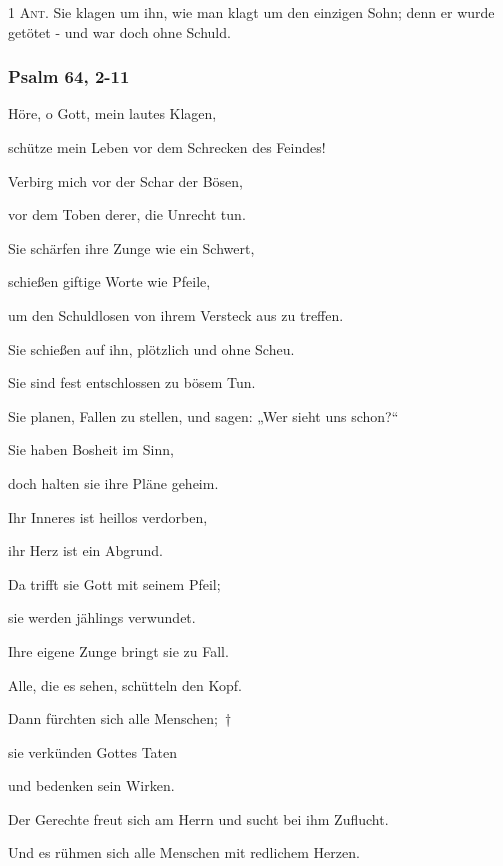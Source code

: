 \noindent \textsc{1 Ant.} Sie klagen um ihn, wie man klagt um den einzigen Sohn; denn er wurde getötet - und war doch ohne Schuld.

\subsubsection{Psalm 64, 2-11}

\noindent Höre, o Gott, mein lautes Klagen,~\GreStar{}~\nopagebreak

schütze mein Leben vor dem Schrecken des Feindes!

\noindent Verbirg mich vor der Schar der Bösen,~\GreStar{}~\nopagebreak

vor dem Toben derer, die Unrecht tun.

\noindent Sie schärfen ihre Zunge wie ein Schwert,~\GreStar{}~\nopagebreak

schießen giftige Worte wie Pfeile,

\noindent um den Schuldlosen von ihrem Versteck aus zu treffen.~\GreStar{}~\nopagebreak

Sie schießen auf ihn, plötzlich und ohne Scheu.

\noindent Sie sind fest entschlossen zu bösem Tun.~\GreStar{}~\nopagebreak

Sie planen, Fallen zu stellen, und sagen: „Wer sieht uns schon?“

\noindent Sie haben Bosheit im Sinn,~\GreStar{}~\nopagebreak

doch halten sie ihre Pläne geheim. 

\noindent Ihr Inneres ist heillos verdorben,~\GreStar{}~\nopagebreak

ihr Herz ist ein Abgrund.

\noindent Da trifft sie Gott mit seinem Pfeil;~\GreStar{}~\nopagebreak

sie werden jählings verwundet.

\noindent Ihre eigene Zunge bringt sie zu Fall.~\GreStar{}~\nopagebreak

Alle, die es sehen, schütteln den Kopf.

\noindent Dann fürchten sich alle Menschen;~†~\nopagebreak

sie verkünden Gottes Taten~\GreStar{}~\nopagebreak

und bedenken sein Wirken.

\noindent Der Gerechte freut sich am Herrn und sucht bei ihm Zuflucht.~\GreStar{}~\nopagebreak

Und es rühmen sich alle Menschen mit redlichem Herzen.


